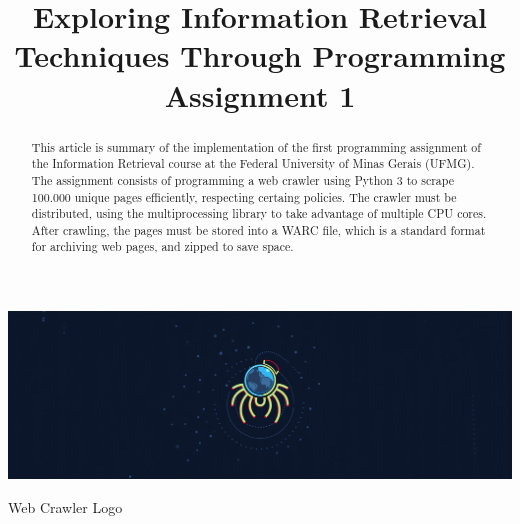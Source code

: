 
\title[Exploring IR Techniques Through PA 1]{Exploring Information Retrieval Techniques Through Programming Assignment 1} %

\begin{abstract}
  This article is summary of the implementation of the first programming assignment of the Information Retrieval course at the Federal University of Minas Gerais (UFMG). The assignment consists of programming a web crawler using Python 3 to scrape 100.000 unique pages efficiently, respecting certaing policies. The crawler must be distributed, using the multiprocessing library to take advantage of multiple CPU cores. After crawling, the pages must be stored into a WARC file, which is a standard format for archiving web pages, and zipped to save space.
\end{abstract}


\begin{teaserfigure}
  \includegraphics[width=\textwidth]{Web_Crawler}
  \caption{Web Crawler Logo}
  \label{fig:teaser}
\end{teaserfigure}


\maketitle

